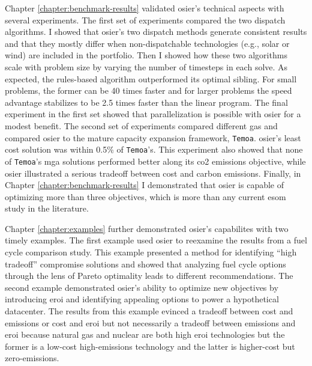 Chapter \ref{chapter:benchmark-results} validated \ac{osier}'s technical aspects
with several experiments. The first set of experiments compared the two dispatch
algorithms. I showed that \ac{osier}'s two dispatch methods generate consistent
results and that they mostly differ when non-dispatchable technologies (e.g.,
solar or wind) are included in the portfolio. Then I showed how these two
algorithms scale with problem size by varying the number of timesteps in each
solve. As expected, the rules-based algorithm outperformed its optimal sibling.
For small problems, the former can be 40 times faster and for larger problems
the speed advantage stabilizes to be 2.5 times faster than the linear program.
The final experiment in the first set showed that parallelization is possible
with \ac{osier} for a modest benefit. The second set of experiments compared
different \acp{ga} and compared \ac{osier} to the mature capacity expansion
framework, \texttt{Temoa}. \ac{osier}'s least cost solution was within 0.5\% of
\texttt{Temoa}'s. This experiment also showed that none of \texttt{Temoa}'s
\ac{mga} solutions performed better along its \ac{co2} emissions objective,
while \ac{osier} illustrated a serious tradeoff between cost and carbon
emissions. Finally, in Chapter \ref{chapter:benchmark-results} I demonstrated
that \ac{osier} is capable of optimizing more than three objectives, which is
more than any current \ac{esom} study in the literature.

Chapter \ref{chapter:examples} further demonstrated \ac{osier}'s capabilites
with two timely examples. The first example used \ac{osier} to reexamine the
results from a fuel cycle comparison study. This example presented a method for
identifying ``high tradeoff'' compromise solutions and showed that analyzing
fuel cycle options through the lens of Pareto optimality leads to different
recommendations. The second example demonstrated \ac{osier}'s ability to
optimize new objectives by introducing \acf{eroi} and identifying appealing
options to power a hypothetical datacenter. The results from this example
evinced a tradeoff between cost and emissions or cost and \ac{eroi} but not
necessarily a tradeoff between emissions and \ac{eroi} because natural gas and
nuclear are both high \ac{eroi} technologies but the former is a low-cost
high-emissions technology and the latter is higher-cost but zero-emissions.

